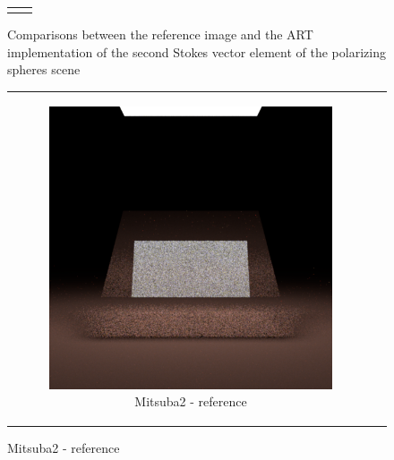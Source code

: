 \begin{figure}[h]
\begin{tabular}{cc}
\begin{subfigure}
			\caption{L1}
		\end{subfigure}
	\end{tabular}
	\caption{Comparisons between the reference image and the ART implementation of the second Stokes vector element of the polarizing spheres scene}
	\label{fig:compare_polar_s1}
\end{figure}

\renewcommand\thesubfigure{\arabic{subfigure}}
\begin{figure}[h]
	\centering
	\begin{tabular}{cc}
		\begin{subfigure}
			{0.4\textwidth}\centering\includegraphics[width=\linewidth]{img/polarizing_plane_90.png}
			\caption{Mitsuba2 - reference}
		\end{subfigure}
		&
		\begin{subfigure}

\end{subfigure}
\end{tabular}
\end{figure}
